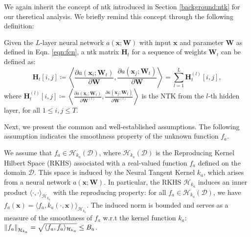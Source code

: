 We again inherit the concept of \acf{ntk} introduced in Section \ref{background:ntk} for our theretical analysis. We briefly remind this concept through the following definition: 
\begin{definition}
    \label{def:neural-cbo_ntk}
    Given the $L$-layer neural network $a(\mathbf{x}; \mathbf{W})$ with input $\mathbf{x}$ and parameter $\mathbf{W}$ as defined in Eqn. \ref{eqn:fcn}, a \ac{ntk} matrix $\mathbf{H}_t$ for a sequence of weights {$\mathbf{W}_t$} can be defined as:
    \begin{equation*}
        \mathbf{H}_t [i, j] \coloneqq \left \langle \frac{\partial a(\mathbf{x}_i; \mathbf{W}_t)}{\partial \mathbf{W}},  \frac{\partial a(\mathbf{x}_j; \mathbf{W}_t)}{\partial \mathbf{W}}\right \rangle = \sum_{l=1}^L \mathbf{H}^{(l)}_t[i, j],
    \end{equation*}
    where $\mathbf{H}^{(l)}_t [i, j] \coloneqq \left \langle \frac{\partial a(\mathbf{x}_i; \mathbf{W}_t)}{\partial \mathbf{W}^{(l)}},  \frac{\partial a(\mathbf{x}_j; \mathbf{W}_t)}{\partial \mathbf{W}^{(l)}}\right \rangle$ is the NTK from the $l$-th hidden layer, for all $1 \le i, j \le T$.
\end{definition}


Next, we present the common and well-established assumptions. The following assumption indicates the smoothness property of the unknown function $f_a$.
\begin{assumption}
\label{assumption:rkhs}
We assume that $f_a \in \mathcal{H}_{k_a}(\mathcal{D})$, where $\mathcal{H}_{k_a}(\mathcal{D})$ is the Reproducing Kernel Hilbert Space (RKHS) associated with a real-valued function $f_a$ defined on the domain $\mathcal{D}$. This space is induced by the Neural Tangent Kernel $k_a$, which arises from a neural network $a(\mathbf{x}; \mathbf{W})$. In particular, the RKHS $\mathcal{H}_{k_a}$ induces an inner product $\langle \cdot, \cdot \rangle_{\mathcal{H}_{k_a}} $ with the reproducing property: for all $f_a \in \mathcal{H}_{k_a}(\mathcal{D})$, we have 
$f_a(\mathbf{x}) = \langle f_a, k_a(\cdot, \mathbf{x}) \rangle_{\mathcal{H}_{k_a}}$. 
The induced norm is bounded and 
serves as a measure of the smoothness of $f_a$ w.r.t the kernel function $k_a$: $\norm{f_a}_{\mathcal{H}_{k_a}} = \sqrt{\langle f_a, f_a \rangle_{\mathcal{H}_{k_a}}} \leq B_a$. 
\end{assumption}


